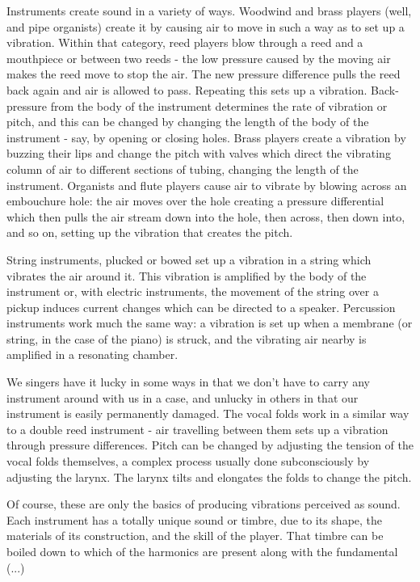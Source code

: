 \documentclass{book}
\begin{document}
Instruments create sound in a variety of ways.  Woodwind and brass players (well, and pipe organists) create it by causing air to move in such a way as to set up a vibration.  Within that category, reed players blow through a reed and a mouthpiece or between two reeds - the low pressure caused by the moving air makes the reed move to stop the air.  The new pressure difference pulls the reed back again and air is allowed to pass.  Repeating this sets up a vibration.  Back-pressure from the body of the instrument determines the rate of vibration or pitch, and this can be changed by changing the length of the body of the instrument - say, by opening or closing holes.  Brass players create a vibration by buzzing their lips and change the pitch with valves which direct the vibrating column of air to different sections of tubing, changing the length of the instrument.  Organists and flute players cause air to vibrate by blowing across an embouchure hole: the air moves over the hole creating a pressure differential which then pulls the air stream down into the hole, then across, then down into, and so on, setting up the vibration that creates the pitch.

String instruments, plucked or bowed set up a vibration in a string which vibrates the air around it.  This vibration is amplified by the body of the instrument or, with electric instruments, the movement of the string over a pickup induces current changes which can be directed to a speaker.  Percussion instruments work much the same way: a vibration is set up when a membrane (or string, in the case of the piano) is struck, and the vibrating air nearby is amplified in a resonating chamber.

We singers have it lucky in some ways in that we don't have to carry any instrument around with us in a case, and unlucky in others in that our instrument is easily permanently damaged.  The vocal folds work in a similar way to a double reed instrument - air travelling between them sets up a vibration through pressure differences.  Pitch can be changed by adjusting the tension of the vocal folds themselves, a complex process usually done subconsciously by adjusting the larynx.  The larynx tilts and elongates the folds to change the pitch.

Of course, these are only the basics of producing vibrations perceived as sound.  Each instrument has a totally unique sound or timbre, due to its shape, the materials of its construction, and the skill of the player.  That timbre can be boiled down to which of the harmonics are present along with the fundamental (...)
\end{document}
